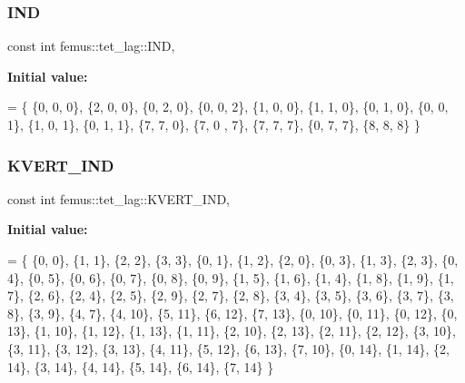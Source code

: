 \subsubsection{\texorpdfstring{I\+ND}{IND}}
{\footnotesize\ttfamily const int femus\+::tet\+\_\+lag\+::\+I\+ND\hspace{0.3cm}{\ttfamily [static]}, {\ttfamily [protected]}}

{\bfseries Initial value\+:}
\begin{DoxyCode}
= \{
    \{0, 0, 0\}, \{2, 0, 0\}, \{0, 2, 0\}, \{0, 0, 2\}, 
    \{1, 0, 0\}, \{1, 1, 0\}, \{0, 1, 0\},
    \{0, 0, 1\}, \{1, 0, 1\}, \{0, 1, 1\}, 
    \{7, 7, 0\}, \{7, 0 , 7\}, \{7, 7, 7\}, \{0, 7, 7\}, 
    \{8, 8, 8\} 
  \}
\end{DoxyCode}
\mbox{\label{classfemus_1_1tet__lag_ac98c86ce4cc17e22ed7a3d4019616ef8}} 
\subsubsection{\texorpdfstring{K\+V\+E\+R\+T\+\_\+\+I\+ND}{KVERT\_IND}}
{\footnotesize\ttfamily const int femus\+::tet\+\_\+lag\+::\+K\+V\+E\+R\+T\+\_\+\+I\+ND\hspace{0.3cm}{\ttfamily [static]}, {\ttfamily [protected]}}

{\bfseries Initial value\+:}
\begin{DoxyCode}
= \{ 
    \{0, 0\}, \{1, 1\}, \{2, 2\}, \{3, 3\},      
    \{0, 1\}, \{1, 2\}, \{2, 0\},
    \{0, 3\}, \{1, 3\}, \{2, 3\},              
    \{0, 4\}, \{0, 5\}, \{0, 6\}, \{0, 7\}, \{0, 8\}, \{0, 9\}, 
    \{1, 5\}, \{1, 6\}, \{1, 4\}, \{1, 8\}, \{1, 9\}, \{1, 7\}, 
    \{2, 6\}, \{2, 4\}, \{2, 5\}, \{2, 9\}, \{2, 7\}, \{2, 8\}, 
    \{3, 4\}, \{3, 5\}, \{3, 6\}, \{3, 7\}, \{3, 8\}, \{3, 9\}, 
    \{4, 7\},                              
    \{4, 10\}, \{5, 11\}, \{6, 12\}, \{7, 13\},  
    \{0, 10\}, \{0, 11\}, \{0, 12\}, \{0, 13\},  
    \{1, 10\}, \{1, 12\}, \{1, 13\}, \{1, 11\},  
    \{2, 10\}, \{2, 13\}, \{2, 11\}, \{2, 12\},  
    \{3, 10\}, \{3, 11\}, \{3, 12\}, \{3, 13\},  
    \{4, 11\}, \{5, 12\}, \{6, 13\}, \{7, 10\},  
    \{0, 14\}, \{1, 14\}, \{2, 14\}, \{3, 14\},  
    \{4, 14\}, \{5, 14\}, \{6, 14\}, \{7, 14\}
  \}
\end{DoxyCode}
\mbox{\label{classfemus_1_1tet__lag_a0b90cc9662627c8291da4c897ed80e2d}} 
